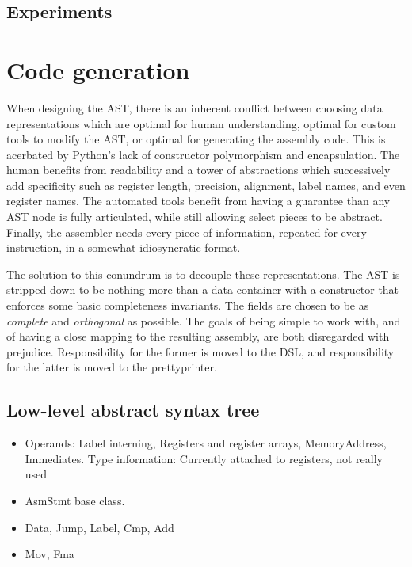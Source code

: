 \subsection{Experiments}




\section{Code generation}

When designing the AST, there is an inherent conflict between choosing data representations which are optimal for human understanding, optimal for custom tools to modify the AST, or optimal for generating the assembly code. This is acerbated by Python's lack of constructor polymorphism and encapsulation. The human benefits from readability and a tower of abstractions which successively add specificity such as register length, precision, alignment, label names, and even register names. The automated tools benefit from having a guarantee than any AST node is fully articulated, while still allowing select pieces to be abstract. Finally, the assembler needs every piece of information, repeated for every instruction, in a somewhat idiosyncratic format.

The solution to this conundrum is to decouple these representations. The AST is stripped down to be nothing more than a data container with a constructor that enforces some basic completeness invariants. The fields are chosen to be as \emph{complete} and \emph{orthogonal} as possible. The goals of being simple to work with, and of having a close mapping to the resulting assembly, are both disregarded with prejudice. Responsibility for the former is moved to the DSL, and responsibility for the latter is moved to the prettyprinter. 

\subsection{Low-level abstract syntax tree}

\begin{itemize}
  \item Operands: Label interning, Registers and register arrays, MemoryAddress, Immediates. Type information: Currently attached to registers, not really used

  \item AsmStmt base class. 
  \item Data, Jump, Label, Cmp, Add
  \item Mov, Fma

\end{itemize}

